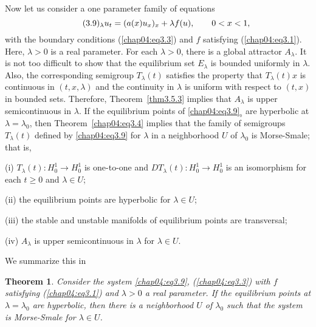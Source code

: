\documentclass{surv-l}
\theoremstyle{plain}
\newtheorem{theorem}{Theorem}[section]
\theoremstyle{definition}
\numberwithin{equation}{section}
\numberwithin{figure}{chapter}
\begin{document}
Now let us consider a one parameter family of equations
\begin{equation} \label{chap04:eq3.9}
 \tag*{(3.9)$_{\lambda}$}u_{t}=(a(x)u_{x})_{x}+\lambda f(u),\qquad 0<x<1,
\end{equation}
with the boundary conditions (\ref{chap04:eq3.3}) and $f$ satisfying (\ref{chap04:eq3.1}). Here, $\lambda >0$ is a real parameter. For each $\lambda>0$, there is a global attractor $A_{\lambda}$. It is not too difficult to show that the equilibrium set $E_{\lambda}$ is bounded uniformly in $\lambda$. Also, the corresponding semigroup $T_{\lambda}(t)$ satisfies the property that $T_{\lambda}(t)x$ is continuous in $(t, x, \lambda)$ and the continuity in $\lambda$ is uniform with respect to $(t, x)$ in bounded sets. Therefore, Theorem~\ref{thm3.5.3} implies that $A_{\lambda}$ is upper semicontinuous in $\lambda$. If the equilibrium points of \ref{chap04:eq3.9}$_{_0}$ are hyperbolic at $\lambda=\lambda_{0}$, then Theorem~\ref{chap04:eq3.4} implies that the family of semigroups $T_{\lambda}(t)$ defined by \ref{chap04:eq3.9} for $\lambda$ in a neighborhood $U$ of $\lambda_{0}$ is Morse-Smale; that is,

(i) $T_{\lambda}(t)\!:H_{0}^{1}\rightarrow H_{0}^{1}$ is one-to-one and $DT_{\lambda}(t)\!:H_{0}^{1}\rightarrow H_{0}^{1}$ is an isomorphism for each $t\geq 0$ and $\lambda \in U$;

(ii) the equilibrium points are hyperbolic for $\lambda \in U$;

(iii) the stable and unstable manifolds of equilibrium points are transversal;

(iv) $A_{\lambda}$ is upper semicontinuous in $\lambda$ for $\lambda\in U$.

We summarize this in

\begin{theorem}\label{thm4.3.5} Consider the system \emph{\ref{chap04:eq3.9}}, \emph{(\ref{chap04:eq3.3})} with $f$ satisfying \emph{(\ref{chap04:eq3.1})} and $\lambda>0$ a real parameter. If the equilibrium points at $\lambda=\lambda_{0}$ are hyperbolic, then there is a neighborhood $U$ of $\lambda_{0}$ such that the system is Morse-Smale for $\lambda \in U$.
\end{theorem}
\end{document}
